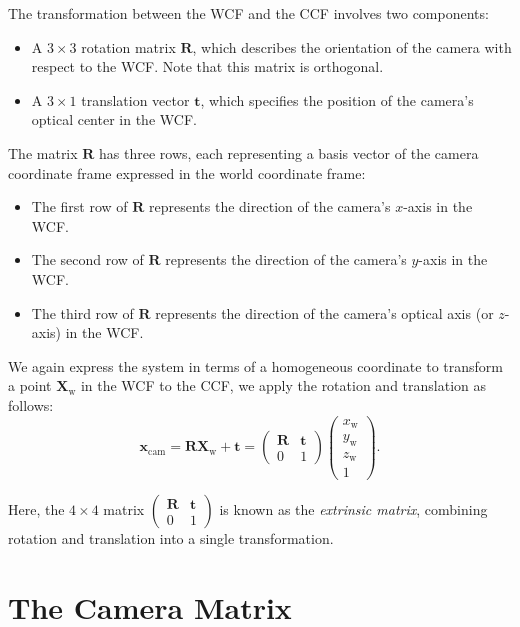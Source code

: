 \documentclass[12pt]{article}
\begin{document}
The transformation between the WCF and the CCF involves two components:
\begin{itemize}
    \item A $3 \times 3$ rotation matrix $\mathbf{R}$, which describes the orientation of the camera with respect to the WCF. Note that this matrix is orthogonal.
    \item A $3 \times 1$ translation vector $\mathbf{t}$, which specifies the position of the camera's optical center in the WCF.
\end{itemize}

The matrix $\mathbf{R}$ has three rows, each representing a basis vector of the camera coordinate frame expressed in the world coordinate frame:
\begin{itemize}
    \item The first row of $\mathbf{R}$ represents the direction of the camera's $x$-axis in the WCF.
    \item The second row of $\mathbf{R}$ represents the direction of the camera's $y$-axis in the WCF.
    \item The third row of $\mathbf{R}$ represents the direction of the camera's optical axis (or $z$-axis) in the WCF.
\end{itemize}

We again express the system in terms of a homogeneous coordinate to transform a point $\mathbf{X}_{\text{w}}$ in the WCF to the CCF, we apply the rotation and translation as follows:
$$
\mathbf{x}_\text{cam} = 
\mathbf{R} \mathbf{X}_{\text{w}} + \mathbf{t} =
\begin{pmatrix} 
\mathbf{R} & \mathbf{t} \\
0 & 1
\end{pmatrix}
\begin{pmatrix} x_{\text{w}} \\ y_{\text{w}} \\ z_{\text{w}} \\ 1 \end{pmatrix}.
$$

Here, the $4\times 4$ matrix $
\begin{pmatrix} 
\mathbf{R} & \mathbf{t} \\
0 & 1
\end{pmatrix}
$
is known as the \textit{extrinsic matrix}, combining rotation and translation into a single transformation.

\section{The Camera Matrix}
\end{document}
